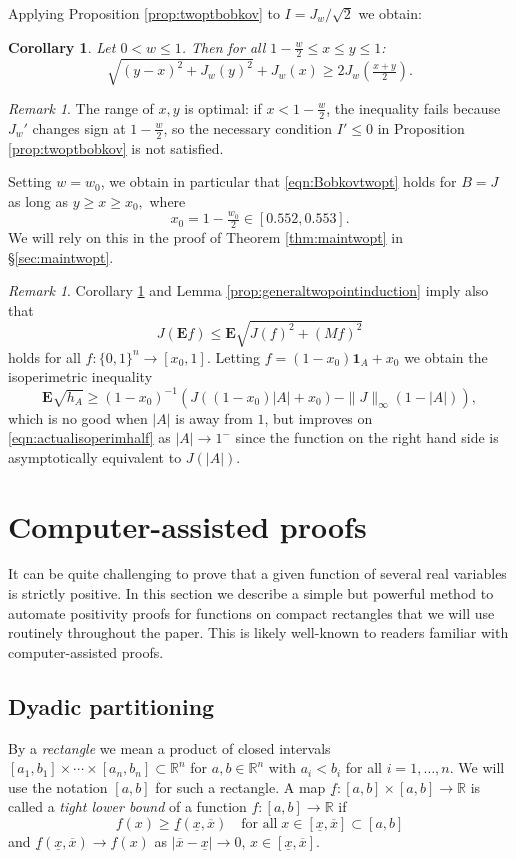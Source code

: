 \documentclass[12pt]{amsart}
\theoremstyle{plain}
\newtheorem{cor}[thm]{Corollary}
\theoremstyle{definition}
\theoremstyle{remark}
\newtheorem{rem}[thm]{Remark}
\numberwithin{equation}{section}
\begin{document}
Applying Proposition \ref{prop:twoptbobkov} to  $I=J_w/\sqrt{2}$ we obtain:
\begin{cor}\label{cor:JsatisfiesBobkovtwopt}
Let $0<w\le 1$. 
Then for all $1-\frac{w}{2}\le x\le y\le 1$:
\[ \sqrt{(y-x)^2 + J_w(y)^2} + J_w(x) \ge 2 J_w(\tfrac{x+y}{2}). \]
\end{cor}
\begin{rem}\label{rem:Jbobkovtwoptfailure}
The range of $x,y$ is optimal: if $x<1-\frac{w}{2}$, the inequality fails because $J_w'$ changes sign at $1-\frac{w}2$, so the necessary condition $I'\le 0$ in Proposition \ref{prop:twoptbobkov} is not satisfied.
\end{rem}
Setting $w=w_0$, we obtain in particular that \eqref{eqn:Bobkovtwopt} holds for $B=J$ as long as $y\ge x\ge x_0,$ where
\begin{equation}\label{eqn:x0def}
x_0 = 1-\tfrac{w_0}2 \in [0.552, 0.553].
\end{equation}
We will rely on this in the proof of Theorem \ref{thm:maintwopt} in \S \ref{sec:maintwopt}.

\begin{rem}\label{rem:asympnearone}
Corollary \ref{cor:JsatisfiesBobkovtwopt} and Lemma \ref{prop:generaltwopointinduction} 
imply also that
\[ J(\mathbf{E} f)\le \mathbf{E} \sqrt{ J(f)^2 + (Mf)^2} \]
holds for all $f:\{0,1\}^n\to [x_0, 1]$.
Letting $f=(1-x_0)\mathbf{1}_A + x_0$ we obtain the isoperimetric inequality
\[ \mathbf{E} \sqrt{h_A} \ge (1-x_0)^{-1}(J((1-x_0)|A|+x_0)-\|J\|_\infty (1-|A|)), \]
which is no good when $|A|$ is away from $1$, but improves on \eqref{eqn:actualisoperimhalf} as $|A|\to 1^-$ since the function on the right hand side is asymptotically equivalent to $J(|A|)$.
\end{rem}

\section{Computer-assisted proofs}\label{sec:auto}
It can be quite challenging to prove that a given function of several real variables is strictly positive.
In this section we describe a simple but powerful method to automate positivity proofs for functions on compact rectangles that we will use routinely throughout the paper. This is likely well-known to readers familiar with computer-assisted proofs.

\subsection{Dyadic partitioning}
By a \emph{rectangle} we mean a product of closed intervals
$[a_1, b_1]\times \cdots \times [a_n, b_n]\subset \mathbb{R}^n$ for $a,b\in \mathbb{R}^n$ with $a_i<b_i$ for all $i=1,\dots,n$. We will use the notation $[a,b]$ for such a rectangle.
A map $\underline{f}:[a,b]\times [a,b]\to \mathbb{R}$ is called a {\em tight lower bound} of a function $f:[a,b]\to \mathbb{R}$ if
\[ f(x)\ge \underline{f}(\underline{x},\overline{x})\quad\text{for all}\; x\in [\underline{x}, \overline{x}]\subset [a,b]\]
and $\underline{f}(\underline{x},\overline{x})\to f(x)$ as $|\overline{x}-\underline{x}|\to 0$, $x\in [\underline{x},\overline{x}]$.
\end{document}
